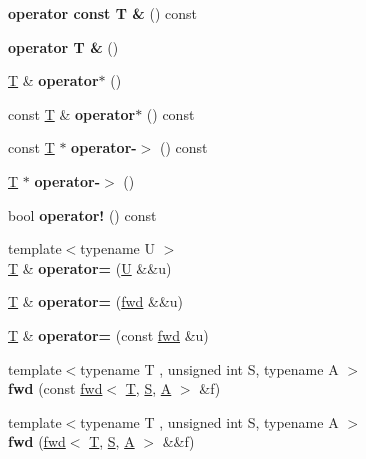 \begin{DoxyCompactItemize}
{\bfseries operator const T \&} () const
\item 
\mbox{\label{classfc_1_1fwd_acdf78bbd392b5abdfbb0cf7163244c49}} 
{\bfseries operator T \&} ()
\item 
\mbox{\label{classfc_1_1fwd_aeeac438894ec4a1946d70c473d01eb97}} 
\mbox{\hyperlink{struct_t}{T}} \& {\bfseries operator$\ast$} ()
\item 
\mbox{\label{classfc_1_1fwd_a040f352d6aae45bc718b41d08c231778}} 
const \mbox{\hyperlink{struct_t}{T}} \& {\bfseries operator$\ast$} () const
\item 
\mbox{\label{classfc_1_1fwd_a2e26988316119316ef358fa5f5d1f855}} 
const \mbox{\hyperlink{struct_t}{T}} $\ast$ {\bfseries operator-\/$>$} () const
\item 
\mbox{\label{classfc_1_1fwd_a2bb1f30ddad9626fed754779cfca65f7}} 
\mbox{\hyperlink{struct_t}{T}} $\ast$ {\bfseries operator-\/$>$} ()
\item 
\mbox{\label{classfc_1_1fwd_a159397b4c41de004ccbcd32ca574c84d}} 
bool {\bfseries operator!} () const
\item 
\mbox{\label{classfc_1_1fwd_a3c7d9ecc22d77ad7dbe66d4f4b5ff5ae}} 
{\footnotesize template$<$typename U $>$ }\\\mbox{\hyperlink{struct_t}{T}} \& {\bfseries operator=} (\mbox{\hyperlink{union_u}{U}} \&\&u)
\item 
\mbox{\label{classfc_1_1fwd_a0f1d678a573b3d69a6411f5acfa286ee}} 
\mbox{\hyperlink{struct_t}{T}} \& {\bfseries operator=} (\mbox{\hyperlink{classfc_1_1fwd}{fwd}} \&\&u)
\item 
\mbox{\label{classfc_1_1fwd_a22ff13dfb7422dcb8e83c40a6c1dc05d}} 
\mbox{\hyperlink{struct_t}{T}} \& {\bfseries operator=} (const \mbox{\hyperlink{classfc_1_1fwd}{fwd}} \&u)
\item 
\mbox{\label{classfc_1_1fwd_a7c5c5c4449cfaedcf200a2305eeac83b}} 
{\footnotesize template$<$typename T , unsigned int S, typename A $>$ }\\{\bfseries fwd} (const \mbox{\hyperlink{classfc_1_1fwd}{fwd}}$<$ \mbox{\hyperlink{struct_t}{T}}, \mbox{\hyperlink{struct_s}{S}}, \mbox{\hyperlink{struct_a}{A}} $>$ \&f)
\item 
\mbox{\label{classfc_1_1fwd_a25e5227132296c3266b127f5357f975c}} 
{\footnotesize template$<$typename T , unsigned int S, typename A $>$ }\\{\bfseries fwd} (\mbox{\hyperlink{classfc_1_1fwd}{fwd}}$<$ \mbox{\hyperlink{struct_t}{T}}, \mbox{\hyperlink{struct_s}{S}}, \mbox{\hyperlink{struct_a}{A}} $>$ \&\&f)
\end{DoxyCompactItemize}


